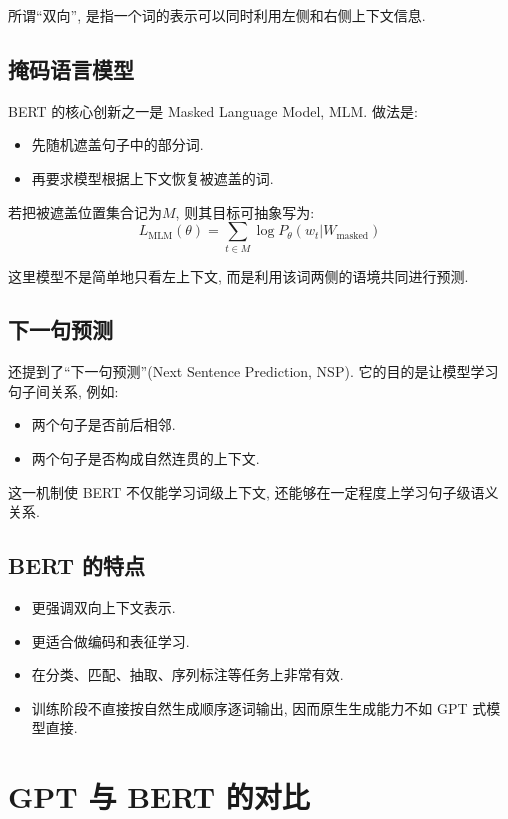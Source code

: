 所谓“双向”, 是指一个词的表示可以同时利用左侧和右侧上下文信息.

\subsection{掩码语言模型}


BERT 的核心创新之一是 Masked Language Model, MLM.
做法是:

\begin{itemize}
\item 先随机遮盖句子中的部分词.
\item 再要求模型根据上下文恢复被遮盖的词.
\end{itemize}

若把被遮盖位置集合记为$M$, 则其目标可抽象写为:
\[
L_{\operatorname{MLM}}(\theta)
  = \sum_{t \in M} \log P_{\theta} (w_t | W_{\operatorname{masked}})
\]

这里模型不是简单地只看左上下文,
而是利用该词两侧的语境共同进行预测.

\subsection{下一句预测}


还提到了“下一句预测”(Next Sentence Prediction, NSP).
它的目的是让模型学习句子间关系, 例如:

\begin{itemize}
\item 两个句子是否前后相邻.
\item 两个句子是否构成自然连贯的上下文.
\end{itemize}

这一机制使 BERT 不仅能学习词级上下文,
还能够在一定程度上学习句子级语义关系.

\subsection{BERT 的特点}


\begin{itemize}
\item 更强调双向上下文表示.
\item 更适合做编码和表征学习.
\item 在分类、匹配、抽取、序列标注等任务上非常有效.
\item 训练阶段不直接按自然生成顺序逐词输出, 因而原生生成能力不如 GPT 式模型直接.
\end{itemize}

\section{GPT 与 BERT 的对比}


